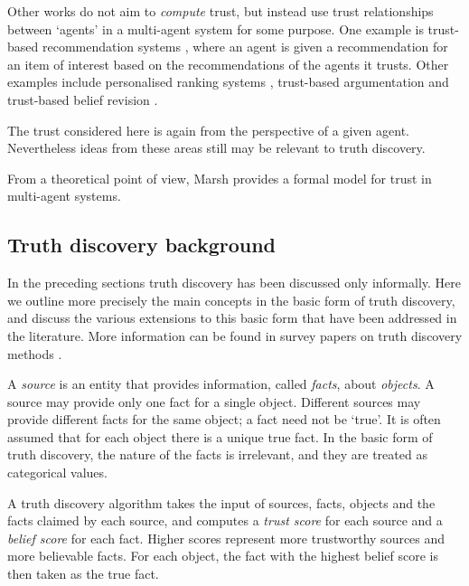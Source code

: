 \documentclass[../main.tex]{subfiles}
\begin{document}
Other works do not aim to \emph{compute} trust, but instead use trust
relationships between `agents' in a multi-agent system for some purpose. One
example is trust-based recommendation systems \cite{andersen}, where an agent
is given a recommendation for an item of interest based on the recommendations
of the agents it trusts. Other examples include personalised ranking systems
\cite{altman_personalised}, trust-based argumentation \cite{tang} and
trust-based belief revision \cite{booth}.

The trust considered here is again from the perspective of a given agent.
Nevertheless ideas from these areas still may be relevant to truth discovery.

From a theoretical point of view, Marsh \cite{marsh} provides a formal model
for trust in multi-agent systems.

\subsection{Truth discovery background}

In the preceding sections truth discovery has been discussed only informally.
Here we outline more precisely the main concepts in the basic form of truth
discovery, and discuss the various extensions to this basic form that have been
addressed in the literature. More information can be found in survey papers on
truth discovery methods \cite{li_survey, gupta_han_survey}.

A \emph{source} is an entity that provides information, called \emph{facts},
about \emph{objects}. A source may provide only one fact for a single object.
Different sources may provide different facts for the same object; a fact need
not be `true'. It is often assumed that for each object there is a unique true
fact. In the basic form of truth discovery, the nature of the facts is
irrelevant, and they are treated as categorical values\footnotemark.


A truth discovery algorithm takes the input of sources, facts, objects and the
facts claimed by each source, and computes a \emph{trust score} for each source
and a \emph{belief score} for each fact. Higher scores represent more
trustworthy sources and more believable facts\footnotemark. For each object,
the fact with the highest belief score is then taken as the true fact.
\end{document}
